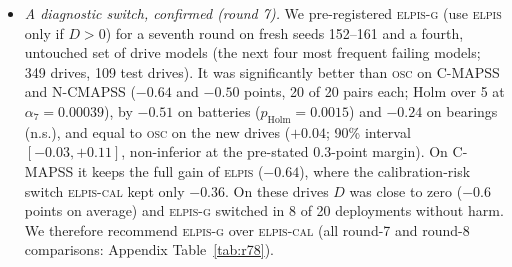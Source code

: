 \documentclass{esannV2}
\newcommand{\OSC}{\textsc{osc}}
\newcommand{\RPT}{\textsc{elpis}}
\newcommand{\AUTO}{\textsc{elpis-cal}}
\newcommand{\AUTOD}{\textsc{elpis-g}}
\begin{document}
\begin{itemize}
\item \emph{A diagnostic switch, confirmed (round 7).} We pre-registered \AUTOD{} (use \RPT{} only if $D>0$) for a seventh round on fresh seeds 152--161 and a fourth, untouched set of drive models (the next four most frequent failing models; 349 drives, 109 test drives). It was significantly better than \OSC{} on C-MAPSS and N-CMAPSS ($-0.64$ and $-0.50$ points, 20 of 20 pairs each; Holm over 5 at $\alpha_7=0.00039$), by $-0.51$ on batteries ($p_{\text{Holm}}=0.0015$) and $-0.24$ on bearings (n.s.), and equal to \OSC{} on the new drives ($+0.04$; 90\% interval $[-0.03,+0.11]$, non-inferior at the pre-stated 0.3-point margin). On C-MAPSS it keeps the full gain of \RPT{} ($-0.64$), where the calibration-risk switch \AUTO{} kept only $-0.36$. On these drives $D$ was close to zero ($-0.6$ points on average) and \AUTOD{} switched in 8 of 20 deployments without harm. We therefore recommend \AUTOD{} over \AUTO{} (all round-7 and round-8 comparisons: Appendix Table~\ref{tab:r78}).

\end{itemize}
\end{document}
